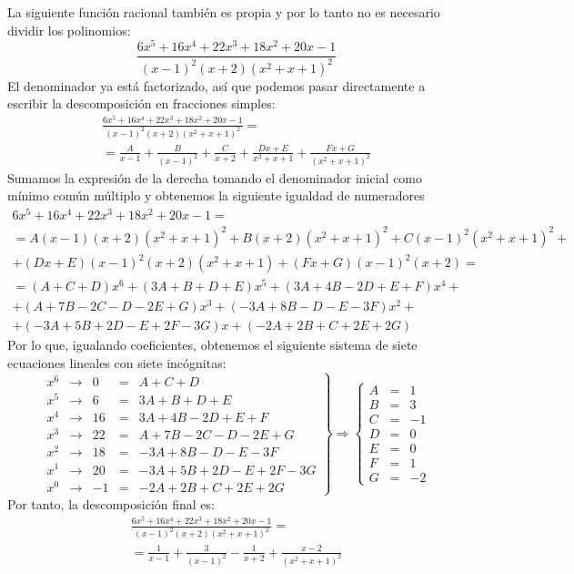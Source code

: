 \begin{ejemplo}\label{ej:rac-simp2}
La siguiente función racional también es propia y por lo tanto no es necesario dividir los polinomios:
\[
\frac{6x^5+16x^4+22x^3+18x^2+20x-1}{(x-1)^2(x+2)(x^2+x+1)^2}
\]
El denominador ya está factorizado, así que podemos pasar directamente a escribir la descomposición en fracciones simples:
\begin{multline*}
\frac{6x^5+16x^4+22x^3+18x^2+20x-1}{(x-1)^2(x+2)(x^2+x+1)^2} =\\
=\frac{A}{x-1}+\frac{B}{(x-1)^2}+\frac{C}{x+2}+\frac{\mathit{D}x+E}{x^2+x+1}+\frac{Fx+G}{(x^2+x+1)^2}
\end{multline*}
Sumamos la expresión de la derecha tomando el denominador inicial como mínimo común múltiplo y obtenemos la siguiente igualdad de numeradores
\begin{multline*}
6x^5+16x^4+22x^3+18x^2+20x-1 =\\
= A(x-1)(x+2)(x^2+x+1)^2 + B(x+2)(x^2+x+1)^2 + C(x-1)^2(x^2+x+1)^2 +\\
+ (\mathit{D}x+E)(x-1)^2(x+2)(x^2+x+1) + (Fx+G)(x-1)^2(x+2) =\\
= (A+C+\mathit{D})x^6+(3A+B+\mathit{D}+E)x^5+(3A+4B-2\mathit{D}+E+F)x^4+\\
+(A+7B-2C-\mathit{D}-2E+G)x^3+(-3A+8B-\mathit{D}-E-3F)x^2+\\
+(-3A+5B+2\mathit{D}-E+2F-3G)x+(-2A+2B+C+2E+2G)
\end{multline*}
Por lo que, igualando coeficientes, obtenemos el siguiente sistema de siete ecuaciones lineales con siete incógnitas:
\[
\left.\begin{array}{rcrcl}
x^6	& \rightarrow &	0		& = & A+C+\mathit{D}		  				\\
x^5	& \rightarrow &	6		& = & 3A+B+\mathit{D}+E					\\
x^4	& \rightarrow &	16	& = & 3A+4B-2\mathit{D}+E+F			\\
x^3	& \rightarrow &	22	& = & A+7B-2C-\mathit{D}-2E+G		\\
x^2	& \rightarrow &	18	& = & -3A+8B-\mathit{D}-E-3F			\\
x^1	& \rightarrow &	20	& = & -3A+5B+2\mathit{D}-E+2F-3G	\\
x^0	& \rightarrow &	-1	& = & -2A+2B+C+2E+2G
\end{array}\right\rbrace \Longrightarrow 
\left\lbrace\begin{array}{rcl}
A		& = & 1		\\
B		& = &	3		\\
C		& = & -1	\\
\mathit{D}		& = & 0		\\
E	  & = & 0		\\
F	  & = & 1		\\
G 	& = & -2
\end{array}\right.
\]
Por tanto, la descomposición final es:
\begin{multline*}
\frac{6x^5+16x^4+22x^3+18x^2+20x-1}{(x-1)^2(x+2)(x^2+x+1)^2} =\\
=\frac{1}{x-1}+\frac{3}{(x-1)^2}-\frac{1}{x+2}+\frac{x-2}{(x^2+x+1)^2}
\end{multline*}
\fej
\end{ejemplo}

